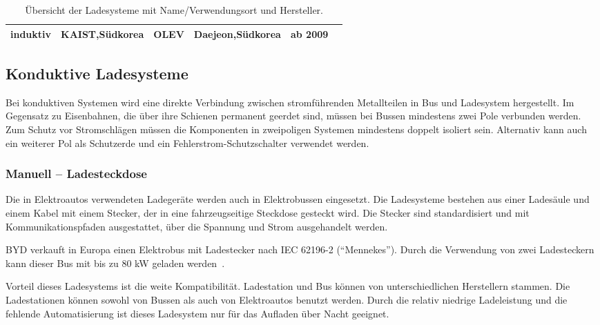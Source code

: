 \begin{table}
\begin{tabularx}{\linewidth}{p{1.5cm}p{1.9cm}p{2.2cm}Xp{2.4cm}p{1.2cm}l}
		         \multicolumn{2}{c}{\multirow{2}{*}{induktiv}}           & \textsc{KAIST},\newline Südkorea                 & OLEV        & Daejeon,\newline Südkorea       & ab 2009          & \cite{5618092}                       \\ \bottomrule
	\end{tabularx}
	\caption[Übersicht der Ladesysteme mit Name/Verwendungsort und Hersteller]{Übersicht der Ladesysteme mit Name/Verwendungsort und Hersteller.}
	\label{uebersichtLadesysteme}
\end{table}


\subsection{Konduktive Ladesysteme} 
Bei konduktiven Systemen wird eine direkte Verbindung zwischen stromführenden Metallteilen in Bus und Ladesystem hergestellt. Im Gegensatz zu Eisenbahnen, die über ihre Schienen permanent geerdet sind, müssen bei Bussen mindestens zwei Pole verbunden werden. Zum Schutz vor Stromschlägen müssen die Komponenten in zweipoligen Systemen mindestens doppelt isoliert sein. Alternativ kann auch ein weiterer Pol als Schutzerde und ein Fehlerstrom-Schutzschalter verwendet werden.

\subsubsection{Manuell – Ladesteckdose}
Die in Elektroautos verwendeten Ladegeräte werden auch in Elektrobussen eingesetzt. Die Ladesysteme bestehen aus einer Ladesäule und einem Kabel mit einem Stecker, der in eine fahrzeugseitige Steckdose gesteckt wird. Die Stecker sind standardisiert und mit Kommunikationspfaden ausgestattet, über die Spannung und Strom ausgehandelt werden.

\textsc{BYD} verkauft in Europa einen Elektrobus mit Ladestecker nach IEC 62196-2 ("`Mennekes"'). Durch die Verwendung von zwei Ladesteckern kann dieser Bus mit bis zu 80 kW geladen werden~\cite{bydSpecs4}.

Vorteil dieses Ladesystems ist die weite Kompatibilität. Ladestation und Bus können von unterschiedlichen Herstellern stammen. Die Ladestationen können sowohl von Bussen als auch von Elektroautos benutzt werden. Durch die relativ niedrige Ladeleistung und die fehlende Automatisierung ist dieses Ladesystem nur für das Aufladen über Nacht geeignet.


